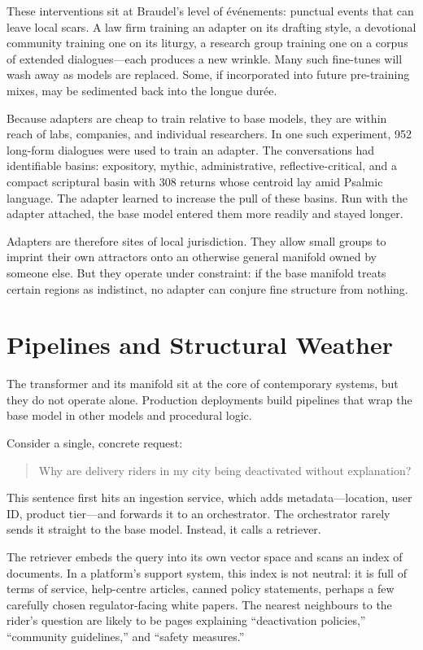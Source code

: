 \documentclass[12pt,a4paper]{article}
\begin{document}
These interventions sit at Braudel's level of événements: punctual events that can leave local scars. A law firm training an adapter on its drafting style, a devotional community training one on its liturgy, a research group training one on a corpus of extended dialogues---each produces a new wrinkle. Many such fine-tunes will wash away as models are replaced. Some, if incorporated into future pre-training mixes, may be sedimented back into the longue durée.

Because adapters are cheap to train relative to base models, they are within reach of labs, companies, and individual researchers. In one such experiment, 952 long-form dialogues were used to train an adapter. The conversations had identifiable basins: expository, mythic, administrative, reflective-critical, and a compact scriptural basin with 308 returns whose centroid lay amid Psalmic language. The adapter learned to increase the pull of these basins. Run with the adapter attached, the base model entered them more readily and stayed longer.

Adapters are therefore sites of local jurisdiction. They allow small groups to imprint their own attractors onto an otherwise general manifold owned by someone else. But they operate under constraint: if the base manifold treats certain regions as indistinct, no adapter can conjure fine structure from nothing.

\section{Pipelines and Structural Weather}

The transformer and its manifold sit at the core of contemporary systems, but they do not operate alone. Production deployments build pipelines that wrap the base model in other models and procedural logic.

Consider a single, concrete request:

\begin{quote}
Why are delivery riders in my city being deactivated without explanation?
\end{quote}

This sentence first hits an ingestion service, which adds metadata---location, user ID, product tier---and forwards it to an orchestrator. The orchestrator rarely sends it straight to the base model. Instead, it calls a retriever.

The retriever embeds the query into its own vector space and scans an index of documents. In a platform's support system, this index is not neutral: it is full of terms of service, help-centre articles, canned policy statements, perhaps a few carefully chosen regulator-facing white papers. The nearest neighbours to the rider's question are likely to be pages explaining ``deactivation policies,'' ``community guidelines,'' and ``safety measures.''
\end{document}
